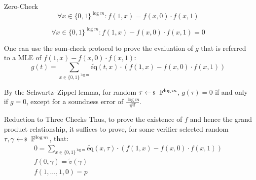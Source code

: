 \documentclass{zkdl-presentation-template}
\begin{document}
    \begin{frame}{Zero-Check}
        \begin{equation*}
            \forall x \in \{0,1\}^{\log m}\colon f(1,x) = f(x, 0) \cdot f(x, 1)
        \end{equation*}

        \vspace{-10px}
        \begin{equation*}
            \forall x \in \{0,1\}^{\log m}\colon f(1,x) - f(x, 0) \cdot f(x, 1) = 0
        \end{equation*}
        \pause

        One can use the sum-check protocol to prove the evaluation of $g$ that is referred to a MLE of $f(1,x) - f(x, 0) \cdot f(x, 1)$:
        \begin{equation*}
            g(t) = \sum_{x \in \{0,1\}^{\log m}} \widetilde{\text{eq}}(t,x) \cdot (f(1,x) - f(x, 0) \cdot f(x, 1))
        \end{equation*}
        \pause

        By the Schwartz–Zippel lemma, for random $\tau \leftarrowS \mathbb{F}^{\log m}$,
        $g(\tau) = 0$ if and only if $g = 0$, except for a soundness error of $\frac{\log m}{\#\mathbb{F}}$.
    \end{frame}

    \begin{frame}{Reduction to Three Checks}
        Thus, to prove the existence of $f$ and hence the grand product relationship, it suffices
        to prove, for some verifier selected random $\tau, \gamma \leftarrowS \mathbb{F}^{\log m}$, that:
        \begin{gather}
        \label{eq:grands0}
            0 = \sum_{x \in \{0,1\}^{\log m}} \widetilde{\text{eq}}(x, \tau) \cdot (f(1,x) - f(x, 0) \cdot f(x, 1))\\
        \label{eq:grands1}
            f(0, \gamma) = \widetilde{v}(\gamma)\\
        \label{eq:grands2}
            f(1,\dots,1, 0) = p
        \end{gather}
    \end{frame}
\end{document}
